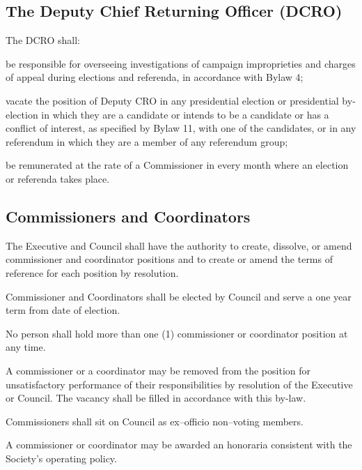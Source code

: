 \subsection {The Deputy Chief Returning Officer (DCRO)} 
\begin{longenum}[ label*=\thesubsection.\arabic*., align=left]
	\item The DCRO shall: 
    \begin{longenum}[ label*=\arabic*., align=left]
		\item be responsible for overseeing investigations of campaign improprieties and charges of appeal during elections and referenda, in accordance with Bylaw 4;
        \item vacate the position of Deputy CRO in any presidential election or presidential by-election in which they are a candidate or intends to be a candidate or has a conflict of interest, as specified by Bylaw 11, with one of the candidates, or in any referendum in which they are a member of any referendum group; 
        \item be remunerated at the rate of a Commissioner in every month where an election or referenda takes place.
	\end{longenum}    
\end{longenum}
\subsection {Commissioners and Coordinators} 
\begin{longenum}[ label*=\thesubsection.\arabic*., align=left]
	\item The Executive and Council shall have the authority to create, dissolve, or amend commissioner and coordinator positions and to create or amend the terms of reference for each position by resolution. 
    \item Commissioner and Coordinators shall be elected by Council and serve a one year term from date of election. 
    \item No person shall hold more than one (1) commissioner or coordinator position at any time.
    \item A commissioner or a coordinator may be removed from the position for unsatisfactory performance of their responsibilities by resolution of the Executive or Council. The vacancy shall be filled in accordance with this by-law.  
    \item Commissioners shall sit on Council as ex--officio non--voting members.
    
    \item A commissioner or coordinator may be awarded an honoraria consistent with the Society's operating policy.
\end{longenum}

